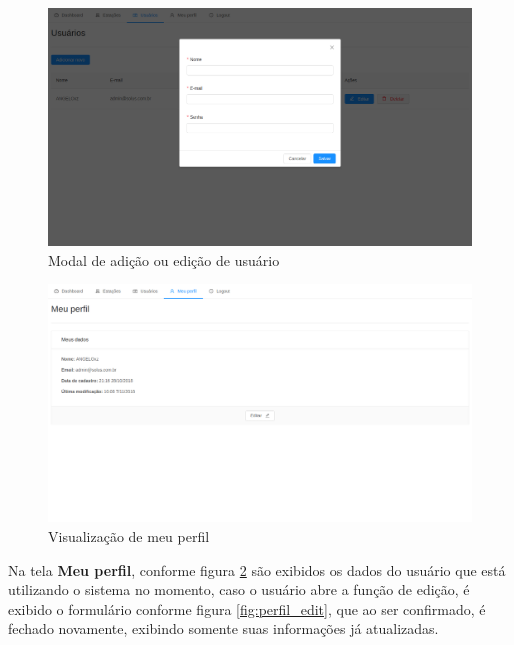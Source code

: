 \begin{figure}[H]
    \centering
    \caption{Modal de adição ou edição de usuário \label{fig:usuarios_add}}
    \includegraphics[scale=0.3]{telas/usuarios_add.png}
    \hfill
{}
\end{figure}

\begin{figure}[H]
    \centering
    \caption{Visualização de meu perfil \label{fig:perfil}}
    \includegraphics[scale=0.3]{telas/perfil.png}
    \hfill
{}
\end{figure}

Na tela \textbf{Meu perfil}, conforme figura \ref{fig:perfil} são exibidos os dados do usuário que está utilizando o sistema no momento, caso o usuário abre a função de edição, é exibido o formulário conforme figura \ref{fig:perfil_edit}, que ao ser confirmado, é fechado novamente, exibindo somente suas informações já atualizadas.


